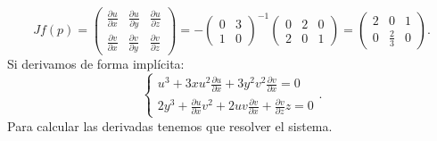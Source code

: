 \begin{eg}
\begin{enumerate}
\[Jf\left(p\right) = \begin{pmatrix} \frac{\partial u}{\partial x} & \frac{\partial u}{\partial y} & \frac{\partial u}{\partial z} \\ \frac{\partial v}{\partial x} & \frac{\partial v}{\partial y} & \frac{\partial v}{\partial z} \end{pmatrix} = -\begin{pmatrix} 0 & 3 \\ 1 & 0 \end{pmatrix}^{-1}\begin{pmatrix} 0 & 2 & 0 \\ 2 & 0 & 1 \end{pmatrix} = \begin{pmatrix} 2 & 0 & 1 \\ 0 & \frac{2}{3} & 0 \end{pmatrix} .\]
Si derivamos de forma implícita:
\[
\begin{cases}
u^{3} + 3xu^{2}\frac{\partial u}{\partial x} + 3y^{2}v^{2}\frac{\partial v}{\partial x} = 0 \\
2y^{3} + \frac{\partial u}{\partial x}v^{2} + 2uv\frac{\partial v}{\partial x} + \frac{\partial v}{\partial z}z = 0
\end{cases}
.\]
Para calcular las derivadas tenemos que resolver el sistema.
\end{enumerate}
\end{eg}
